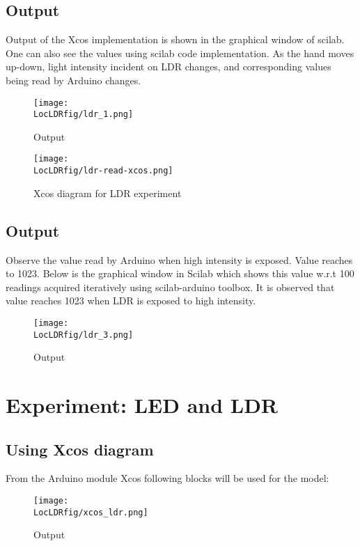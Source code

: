 \subsection{Output}
Output of the Xcos implementation is shown in the graphical window of scilab. One can also see the values using scilab code implementation. As the hand moves up-down, light intensity incident on LDR changes, and corresponding values being read by Arduino changes.
\begin{figure}
\centering
\texttt{[image: \\LocLDRfig/ldr\_1.png]}
\caption{Output}
\label{fig:ldrop-1}
\end{figure}


\begin{figure}
\centering
\texttt{[image: \\LocLDRfig/ldr-read-xcos.png]}
\caption{Xcos diagram for LDR experiment}
\label{fig:ldrexpt-2}
\end{figure}

\subsection{Output}
Observe the value read by Arduino when high intensity is exposed. Value reaches to 1023. Below is the graphical window in Scilab which shows this value w.r.t 100 readings acquired iteratively using scilab-arduino toolbox. It is observed that value reaches 1023 when LDR is exposed to high intensity.
\begin{figure}
\centering
\texttt{[image: \\LocLDRfig/ldr\_3.png]}
\caption{Output}
\label{fig:ldrop-2}
\end{figure}

\section {Experiment: LED and LDR}


\subsection{Using Xcos diagram}
From the Arduino module Xcos following blocks will be used for the model:
\begin{figure}
\centering
\texttt{[image: \\LocLDRfig/xcos\_ldr.png]}
\caption{Output}
\label{fig:xcosldrdesc-2}
\end{figure}


